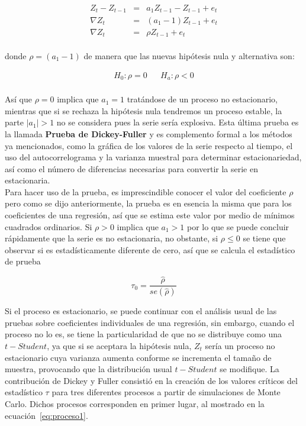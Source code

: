  \begin{eqnarray}\label{eq:proceso1}
 Z_t-Z_{t-1} &  =& a_1Z_{t-1}-Z_{t-1}+e_t\nonumber  \\ 
       \nabla Z_t &= & (a_1-1)Z_{t-1}+e_t   \\
         \nabla Z_t & =& \rho Z_{t-1}+e_t  \nonumber \\
 & &  \nonumber 
\end{eqnarray}

donde $\rho=(a_1-1)$ de manera que las nuevas hipótesis nula y alternativa son:

   \begin{eqnarray}
    H_0: \rho=0 &  &  H_a: \rho  < 0   \\ 
    \nonumber 
   \end{eqnarray} 


 Así que $\rho=0$ implica que $a_1=1$ tratándose de un proceso no estacionario, mientras que si se rechaza la hipótesis nula tendremos un proceso estable, la parte $\left | a_1 \right |>1$ no se considera pues la serie sería explosiva. Esta última prueba es la llamada \textbf{Prueba de Dickey-Fuller} y es complemento formal a los m\'etodos ya mencionados, como la gráfica de los valores de la serie respecto al tiempo, el uso del autocorrelograma y la varianza muestral para determinar estacionariedad, así como el número de diferencias necesarias para convertir la serie en estacionaria.\\
 
 Para hacer uso de la prueba, es imprescindible conocer el valor del coeficiente $\rho$ pero como se dijo anteriormente, la prueba es en esencia la misma que para los coeficientes de una regresión, así que se estima este valor por medio de mínimos cuadrados ordinarios. Si $\rho >0$ implica que $a_1>1$ por lo que se puede concluir rápidamente que la serie es no estacionaria, no obstante, si $\rho \leq 0$ se tiene que observar si es estadísticamente diferente de cero, así que se calcula el estadístico de prueba
 
 \begin{equation}
 \tau_0=\frac{\hat{\rho}}{se(\hat{\rho})}
 \end{equation}
 
Si el proceso es estacionario, se puede continuar con el análisis usual de las pruebas sobre coeficientes individuales de una regresión, sin embargo, cuando el proceso no lo es, se tiene la particularidad de que no se distribuye como una $t-Student$, ya que si se aceptara la hipótesis nula, $Z_t$ sería un proceso no estacionario cuya varianza aumenta conforme se incrementa el tamaño de muestra, provocando que la distribución usual $t-Student$ se modifique. La contribución de Dickey y Fuller consistió en la creación de los valores críticos del estadístico $\tau$ para tres diferentes procesos  a partir de simulaciones de Monte Carlo. Dichos procesos corresponden en primer lugar, al mostrado en la ecuación~\ref{eq:proceso1}. \\

